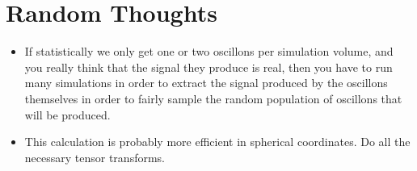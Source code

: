 \documentclass{revtex4}
\begin{document}
\section{Random Thoughts}
\begin{itemize}
\item If statistically we only get one or two oscillons per simulation volume, and you really think that the signal they produce is real, then you have to run many simulations in order to extract the signal produced by the oscillons themselves in order to fairly sample the random population of oscillons that will be produced.
\item This calculation is probably more efficient in spherical coordinates.  Do all the necessary tensor transforms.
\end{itemize}
    
\end{document}
